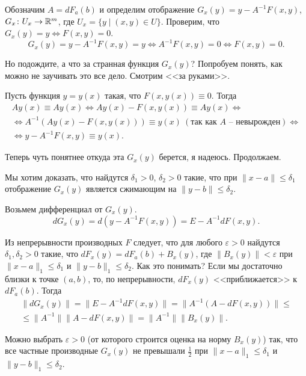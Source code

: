 	\begin{Proof}
		Обозначим $A = dF_a(b)$ и определим отображение $G_x(y) = y - A^{-1}F(x,y)$, $G_x\colon U_x \to \mathbb{R}^m$, где $U_x = \{y\mid (x,y)\in U\}$. Проверим, что $G_x(y) = y \Leftrightarrow F(x,y) = 0$.
		\begin{equation}\label{nepodvizh}
		G_x(y) = y - A^{-1}F(x,y) =y \Leftrightarrow A^{-1}F(x,y) = 0 \Leftrightarrow F(x,y) = 0.
		\end{equation}
		
		Но подождите, а что за странная функция $G_x(y)$? Попробуем понять, как можно не заучивать это все дело. Смотрим <<за руками>>.
		
		Пусть функция $y=y(x)$ такая, что $F(x, y(x)) \equiv 0$. Тогда
		\begin{multline*}
		Ay(x) \equiv Ay(x) \Leftrightarrow Ay(x) - F(x, y(x)) \equiv Ay(x) \Leftrightarrow\\
		\Leftrightarrow A^{-1}(Ay(x) - F(x, y(x)) ) \equiv y(x)\ (\text{так как $A$ -- невырожден})\Leftrightarrow\\
		\Leftrightarrow y - A^{-1}F(x,y) \equiv y(x).
		\end{multline*}
		
		Теперь чуть понятнее откуда эта $G_x(y)$ берется, я надеюсь. Продолжаем.
		
		Мы хотим доказать, что найдутся $\delta_1 > 0$, $\delta_2 > 0$ такие, что при $\|x-a\|\le\delta_1$ отображение $G_x(y)$ является сжимающим на $\|y-b\|\le\delta_2$.
		
		Возьмем дифференциал от $G_x(y)$.
		$$
		dG_x(y) = d(y - A^{-1}F(x,y)) = E - A^{-1}dF(x,y).
		$$
		
		
		Из непрерывности производных $F$ следует, что для любого $\varepsilon > 0$ найдутся $\delta_1, \delta_2 > 0$ такие, что $dF_x(y) = dF_a(b) + B_x(y)$, где $\|B_x(y)\|<\varepsilon$ при $\|x-a\|_1 \le \delta_1$ и $\|y-b\|_1 \le \delta_2$. Как это понимать? Если мы достаточно близки к точке $(a, b)$, то, по непрерывности, $dF_x(y)$ <<приближается>> к $dF_a(b)$.
		Тогда 
		\begin{multline*}
		\|dG_x(y)\|= \|E - A^{-1}dF(x,y)\| = \|A^{-1}(A - dF(x,y))\| \le\\
		\le \|A^{-1}\|\|A - dF(x,y)\| = \|A^{-1}\|\|B_x(y)\|.
		\end{multline*}
		
		Можно выбрать $\varepsilon > 0$ (от которого строится оценка на норму $B_x(y)$) так, что все частные производные $G_x(y)$ не превышали $\frac 1 2$ при $\|x-a\|_1 \le \delta_1$ и $\|y-b\|_1 \le \delta_2$.
		

\end{Proof}
